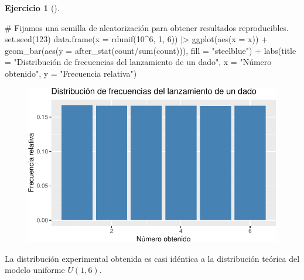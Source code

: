 \documentclass[
  a4paper,
]{scrreport}
\newenvironment{Shaded}{\begin{snugshade}}{\end{snugshade}}
\newcommand{\AttributeTok}[1]{\textcolor[rgb]{0.40,0.45,0.13}{#1}}
\newcommand{\CommentTok}[1]{\textcolor[rgb]{0.37,0.37,0.37}{#1}}
\newcommand{\DecValTok}[1]{\textcolor[rgb]{0.68,0.00,0.00}{#1}}
\newcommand{\FunctionTok}[1]{\textcolor[rgb]{0.28,0.35,0.67}{#1}}
\newcommand{\NormalTok}[1]{\textcolor[rgb]{0.00,0.23,0.31}{#1}}
\newcommand{\SpecialCharTok}[1]{\textcolor[rgb]{0.37,0.37,0.37}{#1}}
\newcommand{\StringTok}[1]{\textcolor[rgb]{0.13,0.47,0.30}{#1}}
\theoremstyle{definition}
\newtheorem{exercise}{Ejercicio}[chapter]
\theoremstyle{remark}
\begin{document}
\begin{exercise}[]
\begin{enumerate}
\begin{tcolorbox}
\begin{Shaded}
\begin{Highlighting}[]
\CommentTok{\# Fijamos una semilla de aleatorización para obtener resultados reproducibles.}
\FunctionTok{set.seed}\NormalTok{(}\DecValTok{123}\NormalTok{)}
\FunctionTok{data.frame}\NormalTok{(}\AttributeTok{x =} \FunctionTok{rdunif}\NormalTok{(}\DecValTok{10}\SpecialCharTok{\^{}}\DecValTok{6}\NormalTok{, }\DecValTok{1}\NormalTok{, }\DecValTok{6}\NormalTok{))  }\SpecialCharTok{|\textgreater{}} 
    \FunctionTok{ggplot}\NormalTok{(}\FunctionTok{aes}\NormalTok{(}\AttributeTok{x =}\NormalTok{ x)) }\SpecialCharTok{+}
    \FunctionTok{geom\_bar}\NormalTok{(}\FunctionTok{aes}\NormalTok{(}\AttributeTok{y =} \FunctionTok{after\_stat}\NormalTok{(count}\SpecialCharTok{/}\FunctionTok{sum}\NormalTok{(count))), }\AttributeTok{fill =} \StringTok{"steelblue"}\NormalTok{) }\SpecialCharTok{+}
    \FunctionTok{labs}\NormalTok{(}\AttributeTok{title =} \StringTok{"Distribución de frecuencias del lanzamiento de un dado"}\NormalTok{, }\AttributeTok{x =} \StringTok{"Número obtenido"}\NormalTok{, }\AttributeTok{y =} \StringTok{"Frecuencia relativa"}\NormalTok{)}
\end{Highlighting}
\end{Shaded}

  \begin{figure}[H]

  {\centering \includegraphics{06-distribuciones-probabilidad_files/figure-pdf/unnamed-chunk-3-1.pdf}

  }

  \end{figure}

  La distribución experimental obtenida es casi idéntica a la
  distribución teórica del modelo uniforme \(U(1,6)\).

  \end{tcolorbox}
\end{enumerate}

\end{exercise}
\end{document}
